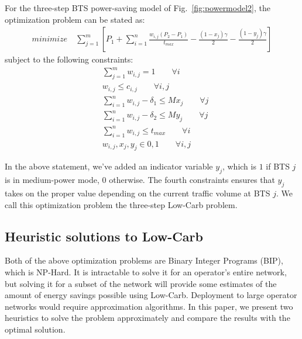For the three-step BTS power-saving model of Fig.~\ref{fig:powermodel2}, the optimization problem can be stated as:
\begin{align}
\textit{minimize} \quad \sum_{j=1}^{m} \left[
P_1+\sum_{i=1}^{n}\frac{w_{i,j}(P_2-P_1)}{t_{max}}-\frac{(1-x_j)\gamma}{2}-\frac{(1-y_j)\gamma}{2}
\right]
\end{align}
subject to the following constraints:
\begin{align}
& \sum_{j=1}^m w_{i,j} = 1 \qquad \forall i \\
& w_{i,j} \leq c_{i,j} \qquad \forall i, j \\
& \sum_{i=1}^nw_{i,j}-\delta_1 \leq Mx_j \qquad \forall j\\
& \sum_{i=1}^nw_{i,j}-\delta_2 \leq My_j \qquad \forall j\\
& \sum_{i=1}^n w_{i,j} \le t_{max} \qquad \forall i \\
& w_{i,j}, x_j, y_j\in {0,1} \qquad \forall i, j%
\end{align}

In the above statement, we've added an indicator variable $y_j$, which is $1$ if BTS $j$ is in medium-power mode, $0$ otherwise. The fourth constraints ensures that $y_j$ takes on the proper value depending on the current traffic volume at BTS $j$. We call this optimization problem the three-step Low-Carb problem.


\subsection{Heuristic solutions to Low-Carb}
\label{subsec:heuristics} Both of the above optimization problems are Binary Integer Programs
(BIP), which is NP-Hard. It is intractable to solve it for an
operator's entire network, but solving it for a subset of the
network will provide some estimates of the amount of energy
savings possible using Low-Carb. Deployment to large operator
networks would require approximation algorithms. In this paper, we present two heuristics to solve the problem approximately and compare the results with the optimal solution.


